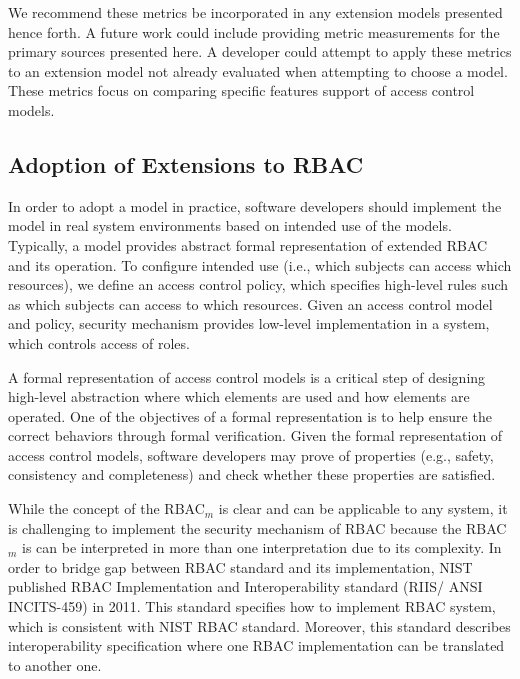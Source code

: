 We recommend these metrics be incorporated in any extension models presented hence forth. A future work could include providing metric measurements for the primary sources presented here. 
A developer could attempt to apply these metrics to an extension model not already evaluated when attempting to choose a model. 
These metrics focus on comparing specific features support of access control models.


\subsection{Adoption of Extensions to RBAC}

In order to adopt a model in practice, software developers should implement the model in real system environments based on intended use of the models. Typically, a model provides abstract formal representation of extended RBAC and its operation. To configure intended use (i.e., which subjects can access which resources), we define an access control policy, which specifies high-level rules such as which subjects can access to which resources. Given an access control model and policy, security mechanism provides low-level implementation in a system, which controls access of roles.

A formal representation of access control models is a critical step of designing high-level abstraction where which elements are used and how elements are operated.
One of the objectives of a formal representation is to help ensure the correct behaviors through formal verification. Given the formal representation of access control models, software developers may prove of properties (e.g., safety, consistency and completeness) and check whether these properties are satisfied. 

While the concept of the RBAC$_{m}$ is clear and can be applicable to any system, it is challenging to implement the security mechanism of RBAC because the RBAC$_{m}$ is can be interpreted in more than one interpretation due to its complexity. In order to bridge gap between RBAC standard and its implementation, NIST published RBAC Implementation and Interoperability standard (RIIS/ ANSI INCITS-459) in 2011. This standard specifies how to implement RBAC system, which is consistent with NIST RBAC standard. Moreover, this standard describes interoperability specification where one RBAC implementation can be translated to another one.

